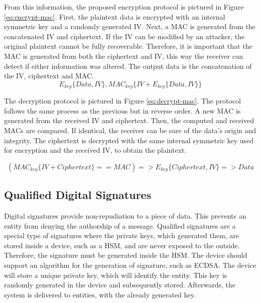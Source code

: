 From this information, the proposed encryption protocol is pictured in Figure \ref{eq:encrypt-mac}. First, the plaintext data is encrypted with an internal symmetric key and a randomly generated IV. Next, a MAC is generated from the concatenated IV and ciphertext.
If the IV can be modified by an attacker, the original plaintext cannot be fully recoverable. Therefore, it is important that the MAC is generated from both the ciphertext and IV, this way the receiver can detect if either information was altered.
The output data is the concatenation of the IV, ciphertext and MAC.
\begin{equation}
	\label{eq:encrypt-mac}
	E_{key}\{Data, IV\}, MAC_{key}\{IV+E_{key}\{Data, IV\}\}
\end{equation}

The decryption protocol is pictured in Figure \ref{eq:decrypt-mac}. The protocol follows the same process as the previous but in reverse order. A new MAC is generated from the received IV and ciphertext. Then, the computed and received MACs are compared. If identical, the receiver can be sure of the data's origin and integrity. The ciphertext is decrypted with the same internal symmetric key used for encryption and the received IV, to obtain the plaintext.

\begin{equation}
	\label{eq:decrypt-mac}
	(MAC_{key}\{IV+Ciphertext\} == MAC) => E_{key}\{Ciphertext, IV\} => Data
\end{equation}

\subsection{Qualified Digital Signatures}\label{chap:arch:services:signatures}

Digital signatures provide non-repudiation to a piece of data. This prevents an entity from denying the authorship of a message. Qualified signatures are a special type of signatures where the private keys, which generated them, are stored inside a device, such as a HSM, and are never exposed to the outside.
Therefore, the signature must be generated inside the HSM. The device should support an algorithm for the generation of signature, such as ECDSA.
The device will store a unique private key, which will identify the entity. This key is randomly generated in the device and subsequently stored. Afterwards, the system is delivered to entities, with the already generated key.

